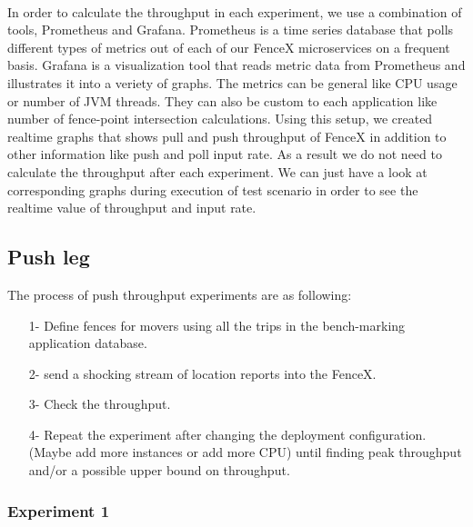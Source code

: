 \documentclass[a4]{report}
\begin{document}
        \paragraph{}
        In order to calculate the throughput in each experiment, we use a combination of tools, Prometheus and
        Grafana\cite{grafana}.
        Prometheus is a time series database that polls different types of metrics out of each of our FenceX
        microservices on a frequent basis.
        Grafana is a visualization tool that reads metric data from Prometheus and illustrates it into a veriety of graphs.
        The metrics can be general like CPU usage or number of JVM threads.
        They can also be custom to each application like number of fence-point intersection calculations.
        Using this setup, we created realtime graphs that shows pull and push throughput of FenceX in addition to other
        information like push and poll input rate.
        As a result we do not need to calculate the throughput after each experiment.
        We can just have a look at corresponding graphs during execution of test scenario in order to see the realtime
        value of throughput and input rate.

        \subsection{Push leg}
        The process of push throughput experiments are as following:
        \begin{itemize}
            \item[1-] Define fences for movers using all the trips in the bench-marking application database.
            \item[2-] send a shocking stream of location reports into the FenceX.
            \item[3-] Check the throughput.
            \item[4-] Repeat the experiment after changing the deployment configuration. (Maybe add more instances or add
            more CPU) until finding peak throughput and/or a possible upper bound on throughput.
        \end{itemize}

        \subsubsection{Experiment 1}
\end{document}
